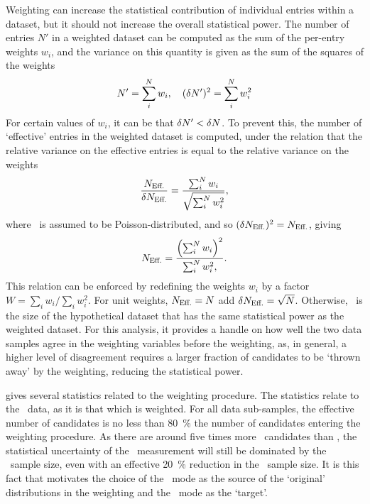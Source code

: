 Weighting can increase the statistical contribution of individual entries 
within a dataset, but it should not increase the overall statistical power.
The number of entries $N'$ in a weighted dataset can be computed as the sum of 
the per-entry weights $w_{i}$, and the variance on this quantity is given as 
the sum of the squares of the weights
\begin{equation}
  N' = \sum_{i}^{N} w_{i},\quad (\delta{N'})^{2} = \sum_{i}^{N} w_{i}^{2}
\end{equation}
For certain values of $w_{i}$, it can be that $\delta{N'} < \delta{N}$.
To prevent this, the number of `effective' entries in the weighted dataset is 
computed, under the relation that the relative variance on the effective 
entries is equal to the relative variance on the weights
\begin{equation}
  \frac{N_{\text{Eff.}}}{\delta{\ensuremath{N_{\text{Eff.}}}}} =
    \frac{\sum_{i}^{N} w_{i}}{\sqrt{\sum_{i}^{N} w_{i}^{2}}},
\end{equation}
where \neff\ is assumed to be Poisson-distributed, and so $(\delta{\ensuremath{N_{\text{Eff.}}}})^{2} = 
N_{\text{Eff.}}$, giving
\begin{equation}
  \neff = \frac{%
    {\left(\sum_{i}^{N}{w_{i}}\right)}^{2}
  }{%
    \sum_{i}^{N}{w_{i}^{2}},
  }.
  \label{eqn:cpv:kinematic_weighting:neff}
\end{equation}
This relation can be enforced by redefining the weights $w_{i}$ by a factor $W 
= \sum_{i} w_{i}/\sum_{i} w_{i}^{2}$.
For unit weights, $N_{\text{Eff.}} = N$ add $\delta{\ensuremath{N_{\text{Eff.}}}} = \sqrt{N}$.
Otherwise, \neff\ is the size of the hypothetical dataset that has the same 
statistical power as the weighted dataset.
For this analysis, it provides a handle on how well the two data samples agree 
in the weighting variables before the weighting, as, in general, a higher level 
of disagreement requires a larger fraction of candidates to be `thrown away' by 
the weighting, reducing the statistical power.

 gives several statistics 
related to the weighting procedure.
The statistics relate to the \ppipi\ data, as it is that which is weighted.
For all data sub-samples, the effective number of candidates is no less than 
\SI{80}{\percent} the number of candidates entering the weighting procedure.
As there are around five times more \ppipi\ candidates than \pKK, the 
statistical uncertainty of the \dACP\ measurement will still be dominated by 
the \pKK\ sample size, even with an effective \SI{20}{\percent} reduction in 
the \ppipi\ sample size.
It is this fact that motivates the choice of the \ppipi\ mode as the source of 
the `original' distributions in the weighting and the \pKK\ mode as the 
`target'.

